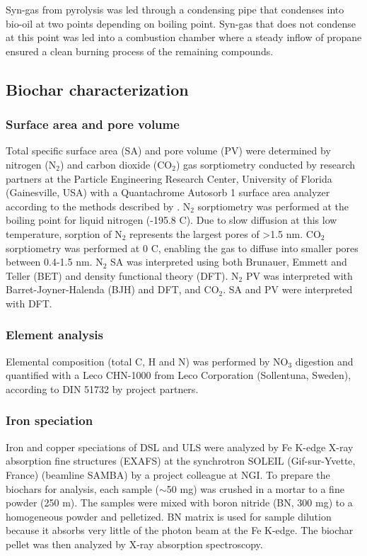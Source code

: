 Syn-gas from pyrolysis was led through a condensing pipe that condenses into bio-oil at two points depending on boiling point. Syn-gas that does not condense at this point was led into a combustion chamber where a steady inflow of propane ensured a clean burning process of the remaining compounds.

\subsection{Biochar characterization}

\subsubsection{Surface area and pore volume}
Total specific surface area (SA) and pore volume (PV) were determined by nitrogen ($\mathrm{N_2}$) and carbon dioxide ($\mathrm{CO_2}$) gas sorptiometry conducted by research partners at the Particle Engineering Research Center, University of Florida (Gainesville, USA) with a Quantachrome Autosorb 1 surface area analyzer according to the methods described by \cite{kwon2005}. $\mathrm{N_2}$ sorptiometry was performed at the boiling point for liquid nitrogen (-195.8 \textdegree C). Due to slow diffusion at this low temperature, sorption of $\mathrm{N_2}$ represents the largest pores of \textgreater 1.5 nm. $\mathrm{CO_2}$ sorptiometry was performed at 0 \textdegree C, enabling the gas to diffuse into smaller pores between 0.4-1.5 nm. $\mathrm{N_2}$ SA was interpreted using both Brunauer, Emmett and Teller (BET) and density functional theory (DFT). $\mathrm{N_2}$ PV was interpreted with Barret-Joyner-Halenda (BJH) and DFT, and $\mathrm{CO_2}$. SA and PV were interpreted with DFT. 

\subsubsection{Element analysis}
Elemental composition (total C, H and N) was performed by $\mathrm{NO_3}$ digestion and quantified with a Leco CHN-1000 from Leco Corporation (Sollentuna, Sweden), according to DIN 51732 by project partners.  

\subsubsection{Iron speciation}
Iron and copper speciations of DSL and ULS were analyzed by Fe K-edge X-ray absorption fine structures (EXAFS) at the synchrotron SOLEIL (Gif-sur-Yvette, France) (beamline SAMBA) by a project colleague at NGI. To prepare the biochars for analysis, each sample ($\sim$50 mg) was crushed in a mortar to a fine powder (250 \textmu m). The samples were mixed with boron nitride (BN, 300 mg) to a homogeneous powder and pelletized. BN matrix is used for sample dilution because it absorbs very little of the photon beam at the Fe K-edge. The biochar pellet was then analyzed by X-ray absorption spectroscopy.  

